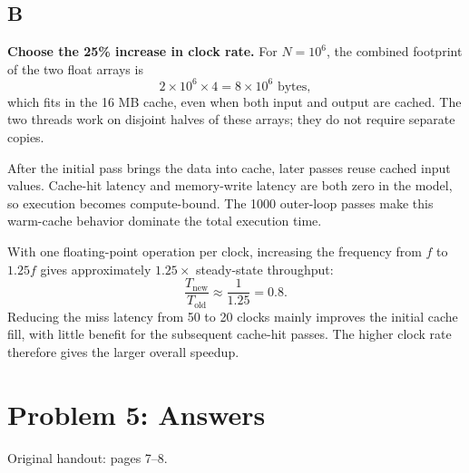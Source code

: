 \documentclass[letterpaper,12pt]{article}
\newcommand{\handout}[1]{%
  
}
\newenvironment{answer}{\par}{\par\medskip}
\begin{document}
\subsection*{B}
\begin{answer}
\textbf{Choose the 25\% increase in clock rate.}
For $N=10^6$, the combined footprint of the two float arrays is
\[
  2\times10^6\times4 = 8\times10^6\text{ bytes},
\]
which fits in the 16 MB cache, even when both input and output are cached.
The two threads work on disjoint halves of these arrays; they do not
require separate copies.

After the initial pass brings the data into cache, later passes reuse
cached input values. Cache-hit latency and memory-write latency are both
zero in the model, so execution becomes compute-bound. The 1000 outer-loop
passes make this warm-cache behavior dominate the total execution time.

With one floating-point operation per clock, increasing the frequency
from $f$ to $1.25f$ gives approximately $1.25\times$ steady-state throughput:
\[
  \frac{T_{\mathrm{new}}}{T_{\mathrm{old}}}
  \approx\frac{1}{1.25}=0.8.
\]
Reducing the miss latency from 50 to 20 clocks mainly improves the initial
cache fill, with little benefit for the subsequent cache-hit passes.
The higher clock rate therefore gives the larger overall speedup.
\end{answer}

\clearpage

\handout{7-8}
\section*{Problem 5: Answers}
\noindent Original handout: pages 7--8.\par
\end{document}
